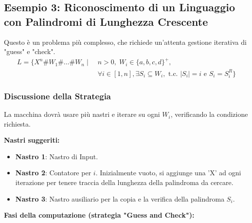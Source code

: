 \documentclass[a4paper]{article}
\begin{document}
\newpage
\subsection{Esempio 3: Riconoscimento di un Linguaggio con Palindromi di Lunghezza Crescente}

Questo è un problema più complesso, che richiede un'attenta gestione iterativa di "guess" e "check".
\begin{align}
L = \{X^n \# W_1 \# \dots \# W_n \mid &\; n>0, \; W_i \in \{a,b,c,d\}^+, \\
&\; \forall i \in [1,n], \exists S_i \subseteq W_i, \text{ t.c. } |S_i|=i \text{ e } S_i = S_i^R \} \nonumber
\end{align}

\subsubsection{Discussione della Strategia}
La macchina dovrà usare più nastri e iterare su ogni $W_i$, verificando la condizione richiesta.

\textbf{Nastri suggeriti:}
\begin{itemize}
    \item \textbf{Nastro 1}: Nastro di Input.
    \item \textbf{Nastro 2}: Contatore per $i$. Inizialmente vuoto, si aggiunge una 'X' ad ogni iterazione per tenere traccia della lunghezza della palindroma da cercare.
    \item \textbf{Nastro 3}: Nastro ausiliario per la copia e la verifica della palindroma $S_i$.
\end{itemize}

\textbf{Fasi della computazione (strategia "Guess and Check"):}
\end{document}
